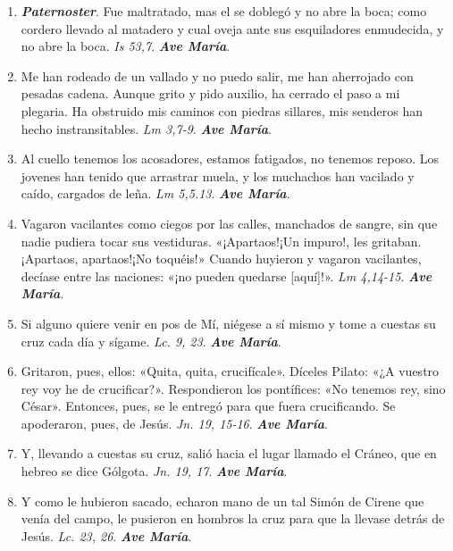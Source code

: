 \documentclass[../../devocionario.tex]{subfiles}
\begin{document}
    \begin{enumerate}
    
        \item \textbf{\textit{Paternoster}}. Fue maltratado, mas el se doblegó y no abre la boca; como cordero llevado al matadero 
            y cual oveja ante sus esquiladores enmudecida, y no abre la boca. \textit{Is 53,7}. \textbf{\textit{Ave María}}.

        \item Me han rodeado de un vallado y no puedo salir, me han aherrojado con pesadas cadena. Aunque grito y pido auxilio, 
            ha cerrado el paso a mi plegaria. Ha obstruido mis caminos con piedras sillares, 
            mis senderos han hecho instransitables. \textit{Lm 3,7-9}. \textbf{\textit{Ave María}}.

        \item Al cuello tenemos los acosadores, estamos fatigados, no tenemos reposo. Los jovenes han tenido que arrastrar muela, 
            y los muchachos han vacilado y caído, cargados de leña. \textit{Lm 5,5.13}. \textbf{\textit{Ave María}}.

        \item Vagaron vacilantes como ciegos por las calles, manchados de sangre, sin que nadie pudiera tocar sus vestiduras. 
            «¡Apartaos!¡Un impuro!, les gritaban. ¡Apartaos, apartaos!¡No toquéis!» 
            Cuando huyieron y vagaron vacilantes, decíase entre las naciones: «¡no pueden quedarse [aquí]!». \textit{Lm 4,14-15}. \textbf{\textit{Ave María}}.

        \item Si alguno quiere venir en pos de Mí, niégese a sí mismo y tome a cuestas su cruz cada día y sígame. \textit{Lc. 9, 23}. \textbf{\textit{Ave María}}.

        \item Gritaron, pues, ellos: «Quita, quita, crucifícale». Díceles Pilato: «¿A vuestro rey voy he de crucificar?». 
            Respondieron los pontífices: «No tenemos rey, sino César». Entonces, pues, se le entregó para que fuera crucificando. 
            Se apoderaron, pues, de Jesús. \textit{Jn. 19, 15-16}. \textbf{\textit{Ave María}}.

        \item Y, llevando a cuestas su cruz, salió hacia el lugar llamado el Cráneo, que en hebreo se dice Gólgota. \textit{Jn. 19, 17}. \textbf{\textit{Ave María}}.

        \item Y como le hubieron sacado, echaron mano de un tal Simón de Cirene que venía del campo, 
            le pusieron en hombros la cruz para que la llevase detrás de Jesús. \textit{Lc. 23, 26}. \textbf{\textit{Ave María}}.


\end{enumerate}
\end{document}
